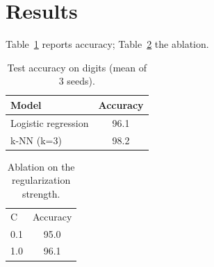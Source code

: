 \section{Results}
Table~\ref{tab:main} reports accuracy; Table~\ref{tab:ablation} the ablation.
\begin{table}[t]
\centering
\caption{Test accuracy on digits (mean of 3 seeds).}
\label{tab:main}
\begin{tabular}{lc}
\hline
Model & Accuracy \\
\hline
Logistic regression & 96.1 \\
k-NN (k=3) & 98.2 \\
\hline
\end{tabular}
\end{table}
\begin{table}[t]
\caption{Ablation on the regularization strength.}
\label{tab:ablation}
\begin{tabular}{lc}
C & Accuracy \\
0.1 & 95.0 \\
1.0 & 96.1 \\
\end{tabular}
\end{table}
